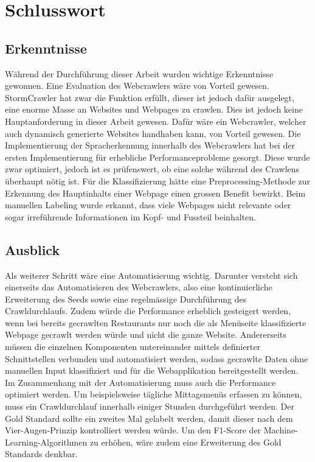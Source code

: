 \chapter{Schlusswort}
\section{Erkenntnisse}
Während der Durchführung dieser Arbeit wurden wichtige Erkenntnisse gewonnen.
Eine Evaluation des Webcrawlers wäre von Vorteil gewesen.
StormCrawler hat zwar die Funktion erfüllt, dieser ist jedoch dafür ausgelegt, eine enorme Masse an Websites und Webpages zu crawlen.
Dies ist jedoch keine Hauptanforderung in dieser Arbeit gewesen.
Dafür wäre ein Webcrawler, welcher auch dynamisch generierte Websites handhaben kann, von Vorteil gewesen.
Die Implementierung der Spracherkennung innerhalb des Webcrawlers hat bei der ersten Implementierung für erhebliche Performanceprobleme gesorgt.
Diese wurde zwar optimiert, jedoch ist es prüfenswert, ob eine solche während des Crawlens überhaupt nötig ist.
Für die Klassifizierung hätte eine Preprocessing-Methode zur Erkennung des Hauptinhalts einer Webpage einen grossen Benefit bewirkt.
Beim manuellen Labeling wurde erkannt, dass viele Webpages nicht relevante oder sogar irreführende Informationen im Kopf- und Fussteil beinhalten.
\section{Ausblick}
Als weiterer Schritt wäre eine Automatisierung wichtig.
Darunter versteht sich einerseits das Automatisieren des Webcrawlers, also eine kontinuierliche Erweiterung des Seeds sowie eine regelmässige Durchführung des Crawldurchlaufs.
Zudem würde die Performance erheblich gesteigert werden, wenn bei bereits gecrawlten Restaurants nur noch die als Menüseite klassifizierte Webpage gecrawlt werden würde und nicht die ganze Website.
Andererseits müssen die einzelnen Komponenten untereinander mittels definierter Schnittstellen verbunden und automatisiert werden, sodass gecrawlte Daten ohne manuellen Input klassifiziert und für die Webapplikation bereitgestellt werden.\\
Im Zusammenhang mit der Automatisierung muss auch die Performance optimiert werden.
Um beispielsweise tägliche Mittagsmenüs erfassen zu können, muss ein Crawldurchlauf innerhalb einiger Stunden durchgeführt werden.
Der Gold Standard sollte ein zweites Mal gelabelt werden, damit dieser nach dem Vier-Augen-Prinzip kontrolliert werden würde.
Um den F1-Score der Machine-Learning-Algorithmen zu erhöhen, wäre zudem eine Erweiterung des Gold Standards denkbar.

